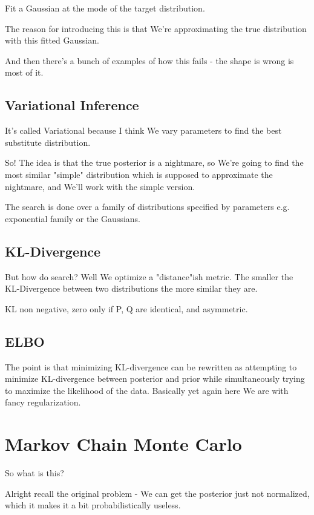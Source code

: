 \documentclass{article}
\begin{document}
		Fit a Gaussian at the mode of the target distribution.
		
		The reason for introducing this is that We're approximating the true distribution with this fitted Gaussian.
		
		And then there's a bunch of examples of how this fails - the shape is wrong is most of it.
		
	\subsection{Variational Inference}
	
		It's called Variational because I think We vary parameters to find the best substitute distribution.
		
		So! The idea is that the true posterior is a nightmare, so We're going to find the most similar "simple" distribution which is supposed to approximate the nightmare, and We'll work with the simple version.
		
		The search is done over a family of distributions specified by parameters e.g. exponential family or the Gaussians.
		
	\subsection{KL-Divergence}
	
		But how do search? Well We optimize a "distance"ish metric. The smaller the KL-Divergence between two distributions the more similar they are.	
		
		KL non negative, zero only if P, Q are identical, and asymmetric.
		
	\subsection{ELBO}
	
		The point is that minimizing KL-divergence can be rewritten as attempting to minimize KL-divergence between posterior and prior while simultaneously trying to maximize the likelihood of the data. Basically yet again here We are with fancy regularization.
		
\section{Markov Chain Monte Carlo}

	So what is this?
	
	Alright recall the original problem - We can get the posterior just not normalized, which it makes it a bit probabilistically useless.
	
\end{document}
